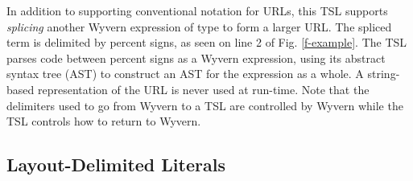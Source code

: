 In addition to supporting conventional notation for URLs, this TSL supports \emph{splicing}
another Wyvern expression of type  to form a larger URL. The spliced term is delimited by percent signs,
as seen on line 2 of Fig. \ref{f-example}. The TSL parses code between percent signs  as a Wyvern expression, using its abstract syntax tree (AST) to construct an AST for the expression as a whole. A string-based representation of the URL is never used at run-time. Note that the delimiters used to go from Wyvern to a TSL are controlled by Wyvern  while the TSL controls how to return to Wyvern. 
\subsection{Layout-Delimited Literals}


